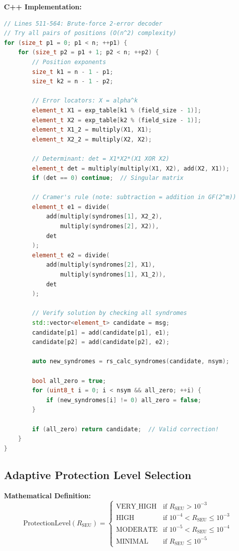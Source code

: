 \documentclass[11pt,a4paper]{article}
\begin{document}
\textbf{C++ Implementation:}
\begin{lstlisting}[language=C++, basicstyle=\small\ttfamily]
// Lines 511-564: Brute-force 2-error decoder
// Try all pairs of positions (O(n^2) complexity)
for (size_t p1 = 0; p1 < n; ++p1) {
    for (size_t p2 = p1 + 1; p2 < n; ++p2) {
        // Position exponents
        size_t k1 = n - 1 - p1;
        size_t k2 = n - 1 - p2;

        // Error locators: X = alpha^k
        element_t X1 = exp_table[k1 % (field_size - 1)];
        element_t X2 = exp_table[k2 % (field_size - 1)];
        element_t X1_2 = multiply(X1, X1);
        element_t X2_2 = multiply(X2, X2);

        // Determinant: det = X1*X2*(X1 XOR X2)
        element_t det = multiply(multiply(X1, X2), add(X2, X1));
        if (det == 0) continue;  // Singular matrix

        // Cramer's rule (note: subtraction = addition in GF(2^m))
        element_t e1 = divide(
            add(multiply(syndromes[1], X2_2),
                multiply(syndromes[2], X2)),
            det
        );
        element_t e2 = divide(
            add(multiply(syndromes[2], X1),
                multiply(syndromes[1], X1_2)),
            det
        );

        // Verify solution by checking all syndromes
        std::vector<element_t> candidate = msg;
        candidate[p1] = add(candidate[p1], e1);
        candidate[p2] = add(candidate[p2], e2);

        auto new_syndromes = rs_calc_syndromes(candidate, nsym);

        bool all_zero = true;
        for (uint8_t i = 0; i < nsym && all_zero; ++i) {
            if (new_syndromes[i] != 0) all_zero = false;
        }

        if (all_zero) return candidate;  // Valid correction!
    }
}
\end{lstlisting}

\subsection{Adaptive Protection Level Selection}

\textbf{Mathematical Definition:}
\begin{equation}
\text{ProtectionLevel}(R_{\text{SEU}}) = \begin{cases}
\text{VERY\_HIGH} & \text{if } R_{\text{SEU}} > 10^{-3} \\
\text{HIGH} & \text{if } 10^{-4} < R_{\text{SEU}} \leq 10^{-3} \\
\text{MODERATE} & \text{if } 10^{-5} < R_{\text{SEU}} \leq 10^{-4} \\
\text{MINIMAL} & \text{if } R_{\text{SEU}} \leq 10^{-5}
\end{cases}
\end{equation}
\end{document}

